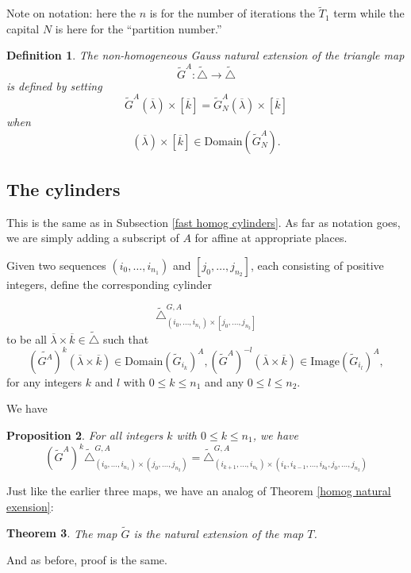 \documentclass[12pt,oneside,openany]{article}
\newtheorem{theorem}{Theorem}[section]
\newtheorem{prop}[theorem]{Proposition}
\newtheorem{definition}[theorem]{Definition}
\begin{document}
 Note on notation:  here the $n$ is for the number of iterations the $\tilde{T}_1$ term while the capital $N$ is here for the ``partition number.''
 
 
 
\begin{definition}
The non-homogeneous Gauss natural extension of  the triangle map 
$$\tilde{G}^A: \tilde{\triangle} \rightarrow \tilde{\triangle} $$
is defined  by setting
$$\tilde{G}^A (\overline{\lambda} )\times [ \overline{k} ] = \tilde{G}_N^A (\overline{\lambda} )\times [ \overline{k} ] $$
when
$$(\overline{\lambda} )\times [ \overline{k} ] \in  \mbox{Domain}(\tilde{G}_N^A) .$$
\end{definition}

 
 
 
 
 
 
 
 \subsection{The cylinders}
 This is the same as in Subsection \ref{fast homog cylinders}.  As far as notation goes, we are simply adding a subscript of $A$ for affine at appropriate places.
 
 
Given two sequences $(i_0, \ldots, i_{n_1})$ and $[j_0, \ldots, j_{n_2}]$, each consisting of positive integers,  define the corresponding  cylinder 


$$\tilde{\triangle}_{ (i_0, \ldots, i_{n_1})\times [j_0, \ldots, j_{n_2}]   }^{G,A}  $$
to be all $\overline{\lambda} \times \overline{k} \in \tilde{\triangle}$ such that 
$$  ( \tilde{G^A})^k(\overline{\lambda} \times \overline{k}) \in  \mbox{Domain}(\tilde{G}_{i_k})^A,   (\tilde{G}^A)^{-l}(\overline{\lambda} \times \overline{k}) \in   \mbox{Image}(\tilde{G}_{i_l})^A,$$
for any  integers $k$ and $l$ with $0\leq k \leq n_1$ and any $0\leq l \leq n_2.$

We have 

\begin{prop} For all integers  $k$ with $0\leq k \leq n_1$, we have 
$$  (\tilde{G}^A)^{k}\tilde{\triangle}_{  (i_0, \ldots, i_{n_1})\times (j_0, \ldots, j_{n_2})   }^{G,A} =   \tilde{\triangle}_{ (i_{k+1},  \ldots, i_{n_1}) \times  (i_k, i_{k-1}, \ldots, i_{k_0}, j_0, \ldots, j_{n_2} ) }^{G,A}  $$
\end{prop}


 Just like the earlier three maps, we have 
 an analog of  Theorem \ref{homog natural exension}:
 \begin{theorem}   The map $\tilde{G}$ is the natural extension of the map $T$.



\end{theorem}
 And as before,  proof is the same.
\end{document}
